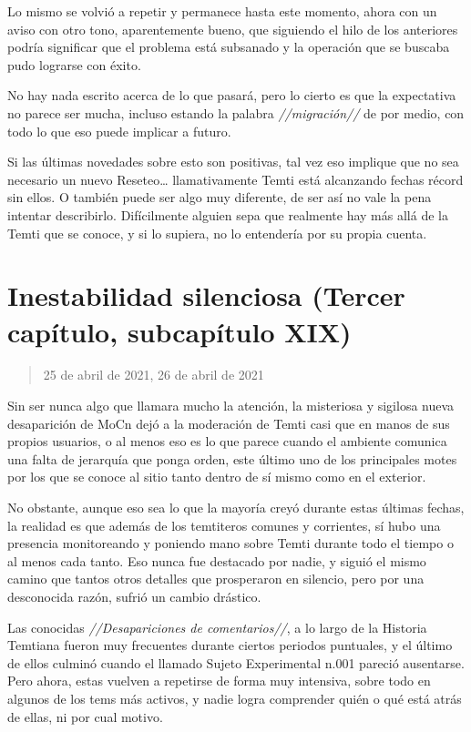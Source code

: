 \documentclass[
  spanish,
]{book}
\begin{document}
Lo mismo se volvió a repetir y permanece hasta este momento, ahora con un aviso con otro tono, aparentemente bueno, que siguiendo el hilo de los anteriores podría significar que el problema está subsanado y la operación que se buscaba pudo lograrse con éxito.

No hay nada escrito acerca de lo que pasará, pero lo cierto es que la expectativa no parece ser mucha, incluso estando la palabra \emph{//migración//} de por medio, con todo lo que eso puede implicar a futuro.

Si las últimas novedades sobre esto son positivas, tal vez eso implique que no sea necesario un nuevo Reseteo\ldots{} llamativamente Temti está alcanzando fechas récord sin ellos. O también puede ser algo muy diferente, de ser así no vale la pena intentar describirlo. Difícilmente alguien sepa que realmente hay más allá de la Temti que se conoce, y si lo supiera, no lo entendería por su propia cuenta.

\hypertarget{inestabilidad-silenciosa-tercer-capuxedtulo-subcapuxedtulo-xix}{%
\section{Inestabilidad silenciosa (Tercer capítulo, subcapítulo XIX)}\label{inestabilidad-silenciosa-tercer-capuxedtulo-subcapuxedtulo-xix}}

\begin{quote}
25 de abril de 2021, 26 de abril de 2021
\end{quote}

Sin ser nunca algo que llamara mucho la atención, la misteriosa y sigilosa nueva desaparición de MoCn dejó a la moderación de Temti casi que en manos de sus propios usuarios, o al menos eso es lo que parece cuando el ambiente comunica una falta de jerarquía que ponga orden, este último uno de los principales motes por los que se conoce al sitio tanto dentro de sí mismo como en el exterior.

No obstante, aunque eso sea lo que la mayoría creyó durante estas últimas fechas, la realidad es que además de los temtiteros comunes y corrientes, sí hubo una presencia monitoreando y poniendo mano sobre Temti durante todo el tiempo o al menos cada tanto. Eso nunca fue destacado por nadie, y siguió el mismo camino que tantos otros detalles que prosperaron en silencio, pero por una desconocida razón, sufrió un cambio drástico.

Las conocidas \emph{//Desapariciones de comentarios//}, a lo largo de la Historia Temtiana fueron muy frecuentes durante ciertos periodos puntuales, y el último de ellos culminó cuando el llamado Sujeto Experimental n.001 pareció ausentarse. Pero ahora, estas vuelven a repetirse de forma muy intensiva, sobre todo en algunos de los tems más activos, y nadie logra comprender quién o qué está atrás de ellas, ni por cual motivo.
\end{document}
